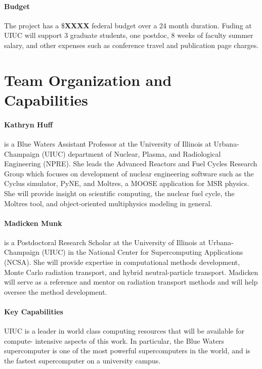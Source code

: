 \documentclass[letterpaper,12pt]{article}
\begin{document}
\paragraph{Budget} The project has a \$\textbf{XXXX} federal budget over a 24 month duration. Fuding at UIUC will support 3 graduate students, one postdoc, 8 weeks of faculty summer salary, and other expenses such as conference travel and publication page charges.


\section{Team Organization and Capabilities}

\paragraph{Kathryn Huff} is a Blue Waters Assistant Professor at the University
of Illinois at Urbana-Champaign (UIUC) department of Nuclear, Plasma, and
Radiological Engineering (NPRE). She leads the Advanced Reactors and Fuel
Cycles Research Group which focuses on development of nuclear engineering
software such as the Cyclus simulator, PyNE, and Moltres, a MOOSE application
for MSR physics. She will provide insight on scientific computing, the nuclear
fuel cycle, the Moltres tool, and object-oriented multiphysics modeling in
general.

\paragraph{Madicken Munk} is a Postdoctoral Research Scholar at the University
of Illinois at Urbana-Champaign (UIUC) in the National Center for Supercomputing
Applications (NCSA). She will provide expertise in computational methods
development, Monte Carlo radiation transport, and hybrid neutral-particle
transport. Madicken will serve as a reference and mentor on radiation transport
methods and will help oversee the method development.

\paragraph{Key Capabilities}

UIUC is a leader in world class computing resources that will be available for compute-
intensive aspects of this work. In particular, the Blue Waters supercomputer is
one of the most powerful supercomputers in the world, and is the fastest
supercomputer on a university campus.
\pagebreak


\end{document}
